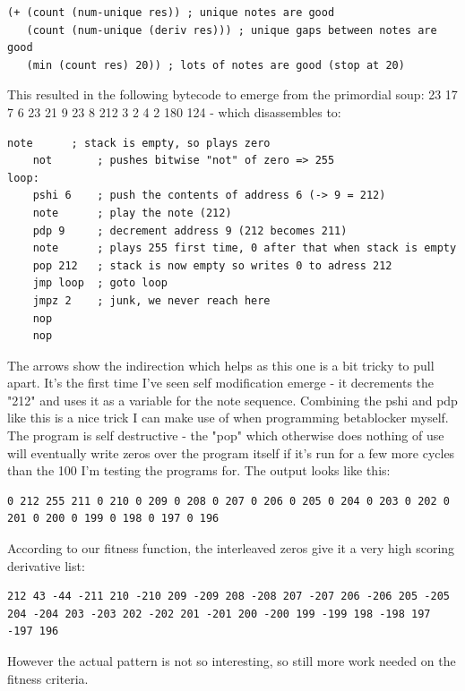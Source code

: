 \documentclass[letterpaper, 12pt]{article}
\begin{document}
\begin{Verbatim}[fontfamily=courier, xleftmargin=\parindent]
(+ (count (num-unique res)) ; unique notes are good
   (count (num-unique (deriv res))) ; unique gaps between notes are good
   (min (count res) 20)) ; lots of notes are good (stop at 20)
\end{Verbatim}
   
This resulted in the following bytecode to emerge from the primordial soup: 23 17 7 6 23 21 9 23 8 212 3 2 4 2 180 124 - which disassembles to:

\begin{Verbatim}[fontfamily=courier, xleftmargin=\parindent]
	note      ; stack is empty, so plays zero
	not       ; pushes bitwise "not" of zero => 255
loop:
	pshi 6    ; push the contents of address 6 (-> 9 = 212)
	note      ; play the note (212)
	pdp 9     ; decrement address 9 (212 becomes 211)
	note      ; plays 255 first time, 0 after that when stack is empty
	pop 212   ; stack is now empty so writes 0 to adress 212
	jmp loop  ; goto loop
	jmpz 2    ; junk, we never reach here
	nop
	nop
\end{Verbatim}

The arrows show the indirection which helps as this one is a bit tricky to pull apart. It's the first time I've seen self modification emerge - it decrements the "212" and uses it as a variable for the note sequence. Combining the pshi and pdp like this is a nice trick I can make use of when programming betablocker myself.
The program is self destructive - the "pop" which otherwise does nothing of use will eventually write zeros over the program itself if it's run for a few more cycles than the 100 I'm testing the programs for.
The output looks like this: 

\begin{Verbatim}[fontfamily=courier, xleftmargin=\parindent]
0 212 255 211 0 210 0 209 0 208 0 207 0 206 0 205 0 204 0 203 0 202 0 201 0 200 0 199 0 198 0 197 0 196
\end{Verbatim}

According to our fitness function, the interleaved zeros give it a very high scoring derivative list:

\begin{Verbatim}[fontfamily=courier, xleftmargin=\parindent]
212 43 -44 -211 210 -210 209 -209 208 -208 207 -207 206 -206 205 -205 204 -204 203 -203 202 -202 201 -201 200 -200 199 -199 198 -198 197 -197 196
\end{Verbatim}

However the actual pattern is not so interesting, so still more work needed on the fitness criteria.
\end{document}
